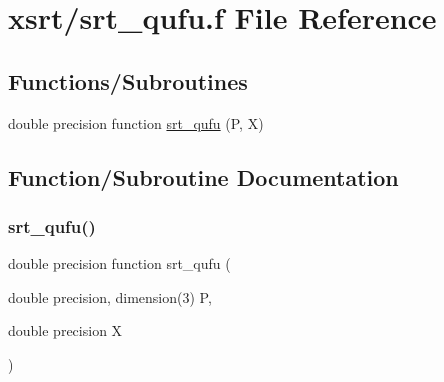 \hypertarget{srt__qufu_8f}{}\section{xsrt/srt\+\_\+qufu.f File Reference}
\label{srt__qufu_8f}
\subsection*{Functions/\+Subroutines}
\begin{DoxyCompactItemize}
\item 
double precision function \hyperlink{srt__qufu_8f_afe9424dc35fe14af3855c694df464d16}{srt\+\_\+qufu} (P, X)
\end{DoxyCompactItemize}


\subsection{Function/\+Subroutine Documentation}
\mbox{\label{srt__qufu_8f_afe9424dc35fe14af3855c694df464d16}} 
\subsubsection{\texorpdfstring{srt\+\_\+qufu()}{srt\_qufu()}}
{\footnotesize\ttfamily double precision function srt\+\_\+qufu (\begin{DoxyParamCaption}\item[{double precision, dimension(3)}]{P,  }\item[{double precision}]{X }\end{DoxyParamCaption})}


